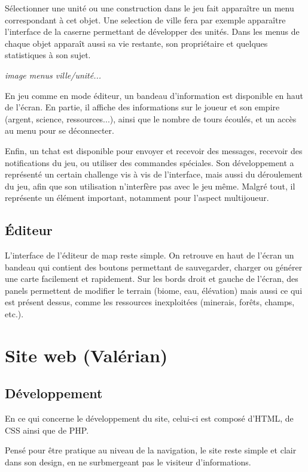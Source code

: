 \documentclass[12pt]{report}
\begin{document}
Sélectionner une unité ou une construction dans le jeu fait apparaître un menu correspondant 
à cet objet. Une selection de ville fera par exemple apparaître l’interface de la caserne permettant 
de développer des unités. Dans les menus de chaque objet apparaît aussi sa vie restante, 
son propriétaire et quelques statistiques à son sujet.

\textit{image menus ville/unité...}

En jeu comme en mode éditeur, un bandeau d’information est disponible en haut de l’écran. En partie, 
il affiche des informations sur le joueur et son empire (argent, science, ressources...), ainsi que le 
nombre de tours écoulés, et un accès au menu pour se déconnecter.

Enfin, un tchat est disponible pour envoyer et recevoir des messages, recevoir des notifications du jeu, 
ou utiliser des commandes spéciales. Son développement a représenté un certain challenge vis à vis de 
l’interface, mais aussi du déroulement du jeu, afin que son utilisation n’interfère pas avec le jeu même. 
Malgré tout, il représente un élément important, notamment pour l’aspect multijoueur.

\subsection{Éditeur}

L’interface de l’éditeur de map reste simple. On retrouve en haut de l’écran un bandeau qui contient des 
boutons permettant de sauvegarder, charger ou générer une carte facilement et rapidement. Sur les bords 
droit et gauche de l’écran, des panels permettent de modifier le terrain (biome, eau, élévation) mais aussi ce 
qui est présent dessus, comme les ressources inexploitées (minerais, forêts, champs, etc.).

\section{Site web (Valérian)}

\subsection{Développement}

En ce qui concerne le développement du site, celui-ci est composé d’HTML, de CSS
ainsi que de PHP.

Pensé pour être pratique au niveau de la navigation, le site reste simple et clair dans
son design, en ne surbmergeant pas le visiteur d’informations. 
\end{document}
